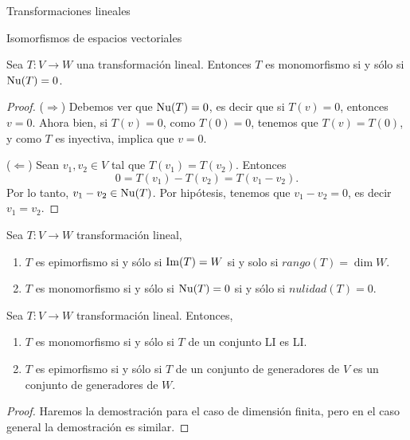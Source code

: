 \begin{chapter}{Transformaciones lineales}
\begin{section}{Isomorfismos de espacios vectoriales}
        \begin{proposicion}\label{inyectiva-sii-nuT=0}
            Sea $T:V \to W$ una transformación lineal. Entonces $T$ es monomorfismo si y sólo si $\operatorname{Nu}(T) =0$.
        \end{proposicion}	
        \begin{proof} 
            
            ($\Rightarrow$) Debemos ver que  $\operatorname{Nu}(T)=0$,  es decir que si $T(v)=0$,  entonces  $v=0$. Ahora bien,  si $T(v) = 0$, como  $T(0)=0$, tenemos que $T(v)  = T(0)$, y como $T$ es inyectiva, implica que $v =0$.
            
            ($\Leftarrow$) Sean  $v_1,v_2 \in V$ tal que $T(v_1)=T(v_2)$. Entonces 
            $$
            0 = T(v_1)- T(v_2) = T(v_1 -v_2).
            $$
            Por  lo tanto, $v_1 -v_2 \in \operatorname{Nu}(T)$. Por hipótesis, tenemos que $v_1 -v_2 =0$,  es decir $v_1 = v_2$.
        \end{proof}
        
        
        \begin{obs*} Sea $T: V \to W$ transformación lineal, 
            \begin{enumerate}
                \item $T$  es {epimorfismo} si y sólo  si $\operatorname{Im}(T) = W$ si  y solo si $rango(T) = \dim W$.
                \item $T$ es {monomorfismo} si y sólo  si $\operatorname{Nu}(T) = 0$ si y sólo si $nulidad(T) =0$.
            \end{enumerate}  
        \end{obs*}		
        
        \begin{proposicion}\label{prop-T-mono-sii-li-2-li} Sea $T:V \to W$ transformación lineal. Entonces,
            \begin{enumerate}
                \item\label{itm-T-mono-sii} $T$ es monomorfismo si y sólo si $T$ de un conjunto LI  es  LI.
                \item\label{itm-T-epi-sii} $T$ es epimorfismo si y sólo si $T$ de un conjunto de generadores de $V$ es un conjunto de generadores de $W$.
            \end{enumerate}
        \end{proposicion}
        \begin{proof} Haremos la demostración para el caso de dimensión finita,  pero en el caso general la demostración es similar. 
            

\end{proof}
\end{section}
\end{chapter}
